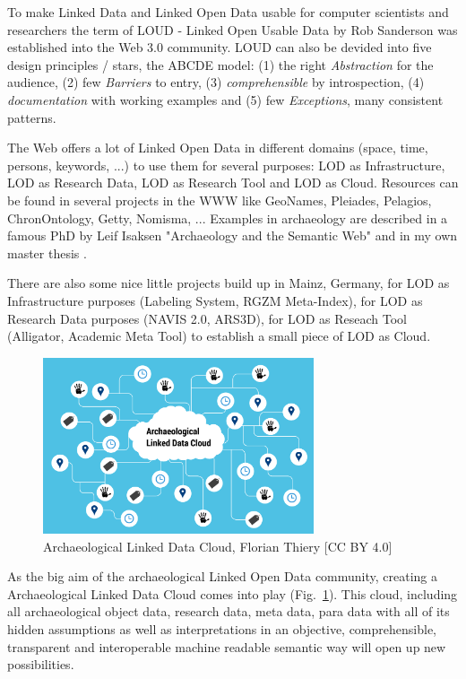 \documentclass[twocolumn]{autart}
\begin{document}
To make Linked Data and Linked Open Data usable for computer scientists and researchers the term of LOUD - Linked Open Usable Data \cite{sanderson_loud} by Rob Sanderson was established into the Web 3.0 community. LOUD can also be devided into five design principles / stars, the ABCDE model: (1) the right \textit{Abstraction} for the audience, (2) few \textit{Barriers} to entry, (3) \textit{comprehensible} by introspection, (4) \textit{documentation} with working examples and (5) few \textit{Exceptions}, many consistent patterns.

The Web offers a lot of Linked Open Data in different domains (space, time, persons, keywords, ...) to use them for several purposes: LOD as Infrastructure, LOD as Research Data, LOD as Research Tool and LOD as Cloud. Resources can be found in several projects in the WWW like GeoNames, Pleiades, Pelagios, ChronOntology, Getty, Nomisma, ... Examples in archaeology are described in a famous PhD by Leif Isaksen "Archaeology and the Semantic Web" \cite{isaksen_archaeology} and in my own master thesis \cite{thiery_geinarfa}.

There are also some nice little projects build up in Mainz, Germany, for LOD as Infrastructure purposes (Labeling System, RGZM Meta-Index), for LOD as Research Data purposes (NAVIS 2.0, ARS3D), for LOD as Reseach Tool (Alligator, Academic Meta Tool) to establish a small piece of LOD as Cloud.

\begin{figure}[!htb]
\begin{center}
\includegraphics[width=8cm]{Archaeological_Linked_Data_Cloud_(ALDC).png}
\caption{Archaeological Linked Data Cloud, Florian Thiery [CC BY 4.0]}
\label{figaaldc}
\end{center}
\end{figure}

As the big aim of the archaeological Linked Open Data community, creating a Archaeological Linked Data Cloud comes into play (Fig.~\ref{figaaldc}). This cloud, including all archaeological object data, research data, meta data, para data with all of its hidden assumptions as well as interpretations in an objective, comprehensible, transparent and interoperable machine readable semantic way will open up new possibilities.
\end{document}
